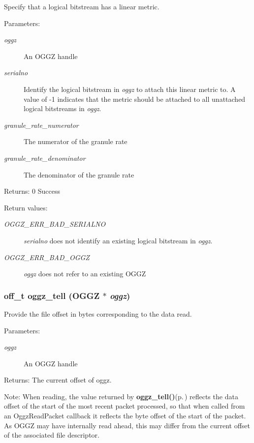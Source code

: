 Specify that a logical bitstream has a linear metric. 

\begin{Desc}
\item[Parameters:]
\begin{description}
\item[{\em oggz}]An OGGZ handle \item[{\em serialno}]Identify the logical bitstream in {\em oggz\/} to attach this linear metric to. A value of -1 indicates that the metric should be attached to all unattached logical bitstreams in {\em oggz\/}. \item[{\em granule\_\-rate\_\-numerator}]The numerator of the granule rate \item[{\em granule\_\-rate\_\-denominator}]The denominator of the granule rate \end{description}
\end{Desc}
\begin{Desc}
\item[Returns:]0 Success \end{Desc}
\begin{Desc}
\item[Return values:]
\begin{description}
\item[{\em OGGZ\_\-ERR\_\-BAD\_\-SERIALNO}]{\em serialno\/} does not identify an existing logical bitstream in {\em oggz\/}. \item[{\em OGGZ\_\-ERR\_\-BAD\_\-OGGZ}]{\em oggz\/} does not refer to an existing OGGZ \end{description}
\end{Desc}
\subsubsection{\setlength{\rightskip}{0pt plus 5cm}off\_\-t oggz\_\-tell ({\bf OGGZ} $\ast$ {\em oggz})}\label{group__seek__api_a5}


Provide the file offset in bytes corresponding to the data read. 

\begin{Desc}
\item[Parameters:]
\begin{description}
\item[{\em oggz}]An OGGZ handle \end{description}
\end{Desc}
\begin{Desc}
\item[Returns:]The current offset of oggz.\end{Desc}
\begin{Desc}
\item[Note:]When reading, the value returned by {\bf oggz\_\-tell()}{\rm (p.\,\pageref{group__seek__api_a5})} reflects the data offset of the start of the most recent packet processed, so that when called from an Oggz\-Read\-Packet callback it reflects the byte offset of the start of the packet. As OGGZ may have internally read ahead, this may differ from the current offset of the associated file descriptor. \end{Desc}
